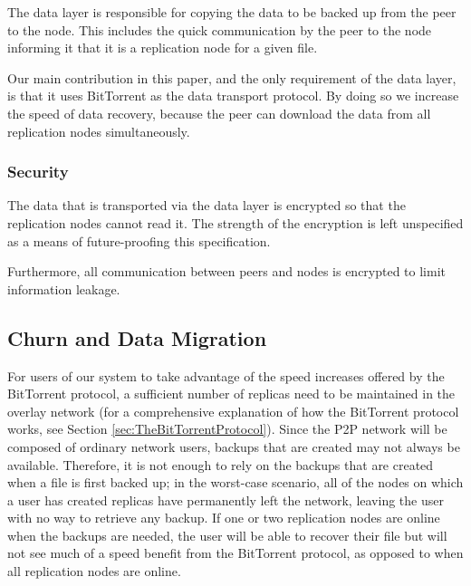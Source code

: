 \documentclass[12pt]{report}
\begin{document}
The data layer is responsible for copying the data to be backed up from the peer to the node. This includes the quick communication by the peer to the node informing it that it is a replication node for a given file.

Our main contribution in this paper, and the only requirement of the data layer, is that it uses BitTorrent as the data transport protocol. By doing so we increase the speed of data recovery, because the peer can download the data from all replication nodes simultaneously.

\subsubsection{Security}

The data that is transported via the data layer is encrypted so that the replication nodes cannot read it. The strength of the encryption is left unspecified as a means of future-proofing this specification.

Furthermore, all communication between peers and nodes is encrypted to limit information leakage.

\subsection{Churn and Data Migration} \label{sec:ChurnandDataMigration_DataExchange}

For users of our system to take advantage of the speed increases offered by the BitTorrent protocol, a sufficient number of replicas need to be maintained in the overlay network (for a comprehensive explanation of how the BitTorrent protocol works, see Section \ref{sec:TheBitTorrentProtocol}). Since the P2P network will be composed of ordinary network users, backups that are created may not always be available. Therefore, it is not enough to rely on the backups that are created when a file is first backed up; in the worst-case scenario, all of the nodes on which a user has created replicas have permanently left the network, leaving the user with no way to retrieve any backup. If one or two replication nodes are online when the backups are needed, the user will be able to recover their file but will not see much of a speed benefit from the BitTorrent protocol, as opposed to when all replication nodes are online.
\end{document}
